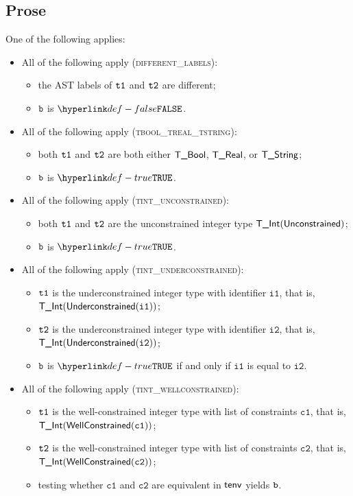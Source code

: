 \documentclass{book}
\newcommand\ProseOrTypeError[0]{\ProseTerminateAs{\TypeErrorConfig}}
\newcommand\vcone[0]{\texttt{c1}}
\newcommand\vctwo[0]{\texttt{c2}}
\newcommand\vione[0]{\texttt{i1}}
\newcommand\vitwo[0]{\texttt{i2}}
\begin{document}
\subsection{Prose}
One of the following applies:
\begin{itemize}
  \item All of the following apply (\textsc{different\_labels}):
  \begin{itemize}
    \item the AST labels of $\texttt{t1}$ and $\texttt{t2}$ are different;
    \item $\texttt{b}$ is $\False$.
  \end{itemize}

  \item All of the following apply (\textsc{tbool\_treal\_tstring}):
  \begin{itemize}
    \item both $\texttt{t1}$ and $\texttt{t2}$ are both either $\textsf{T\_Bool}$, $\textsf{T\_Real}$, or $\textsf{T\_String}$;
    \item $\texttt{b}$ is $\True$.
  \end{itemize}

  \item All of the following apply (\textsc{tint\_unconstrained}):
  \begin{itemize}
    \item both $\texttt{t1}$ and $\texttt{t2}$ are the unconstrained integer type $\textsf{T\_Int}(\textsf{Unconstrained})$;
    \item $\texttt{b}$ is $\True$.
  \end{itemize}

  \item All of the following apply (\textsc{tint\_underconstrained}):
  \begin{itemize}
    \item $\texttt{t1}$ is the underconstrained integer type with identifier $\vione$, that is, \\ $\TInt(\underconstrained(\vione))$;
    \item $\texttt{t2}$ is the underconstrained integer type with identifier $\vitwo$, that is, \\ $\TInt(\underconstrained(\vitwo))$;
    \item $\texttt{b}$ is $\True$ if and only if $\vione$ is equal to $\vitwo$.
  \end{itemize}

  \item All of the following apply (\textsc{tint\_wellconstrained}):
  \begin{itemize}
    \item $\texttt{t1}$ is the well-constrained integer type with list of constraints $\vcone$, that is, \\ $\TInt(\wellconstrained(\vcone))$;
    \item $\texttt{t2}$ is the well-constrained integer type with list of constraints $\vctwo$, that is, \\ $\TInt(\wellconstrained(\vctwo))$;
    \item testing whether $\vcone$ and $\vctwo$ are equivalent in $\textsf{tenv}$ yields $\texttt{b}$\ProseOrTypeError.
  \end{itemize}


\end{itemize}
\end{document}

